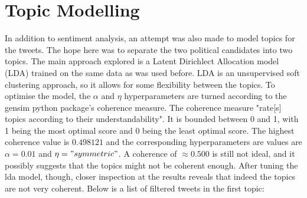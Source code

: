\documentclass{article}
\begin{document}
  \section{Topic Modelling}

  \indent In addition to sentiment analysis, an attempt was also made
  to model topics for the tweets. The hope here was to separate the two
  political candidates into two topics. The main approach explored is
  a Latent Dirichlect Allocation model (LDA) trained on the same data
  as was used before. LDA is an unsupervised soft clustering approach,
  so it allows for some flexibility between the topics. To optimise the
  model, the $\alpha$ and $\eta$ hyperparameters are turned according
  to the gensim python package's coherence measure. The coherence
  measure "rate[s] topics according to their understandability"\autocite[399]{roder_2015}. It is 
  bounded between 0 and 1, with 1 being the most optimal score and 0
  being the least optimal score.   The highest coherence value is
  $0.498121$ and the corresponding hyperparameters are values are
  $\alpha = 0.01$ and $\eta = "symmetric"$. A coherence of $\approx
  0.500$ is still not ideal, and it possibly suggests that the topics
  might not be coherent enough. After tuning the lda model, though,
  closer  inspection at the results reveals that indeed the topics are
  not very coherent. Below is a list of filtered tweets in the first topic: 

  

\end{document}
